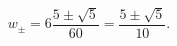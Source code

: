 \setcounter{equation}{37}
\begin{equation}
 w_\pm=6\frac{5\pm\sqrt5}{60}
 =\frac{5\pm\sqrt5}{10}.
\label{eq:bornmasses}
\end{equation}
